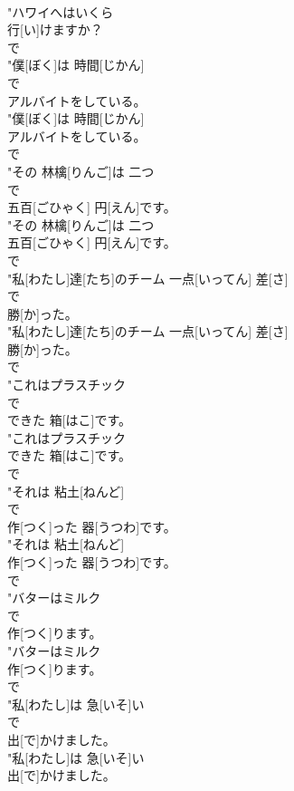 \documentclass[8pt]{extreport}
\begin{document}
\begin{CJK}{UTF8}{min}
\\	"ハワイへはいくら
\\	行[い]けますか？
\\	で
\\	"僕[ぼく]は 時間[じかん]
\\	で
\\	アルバイトをしている。
\\	"僕[ぼく]は 時間[じかん]
\\	アルバイトをしている。
\\	で
\\	"その 林檎[りんご]は 二つ
\\	で
\\	五百[ごひゃく] 円[えん]です。
\\	"その 林檎[りんご]は 二つ
\\	五百[ごひゃく] 円[えん]です。
\\	で
\\	"私[わたし]達[たち]のチーム 一点[いってん] 差[さ]
\\	で
\\	勝[か]った。
\\	"私[わたし]達[たち]のチーム 一点[いってん] 差[さ]
\\	勝[か]った。
\\	で
\\	"これはプラスチック
\\	で
\\	できた 箱[はこ]です。
\\	"これはプラスチック
\\	できた 箱[はこ]です。
\\	で
\\	"それは 粘土[ねんど]
\\	で
\\	作[つく]った 器[うつわ]です。
\\	"それは 粘土[ねんど]
\\	作[つく]った 器[うつわ]です。
\\	で
\\	"バターはミルク
\\	で
\\	作[つく]ります。
\\	"バターはミルク
\\	作[つく]ります。
\\	で
\\	"私[わたし]は 急[いそ]い
\\	で
\\	出[で]かけました。
\\	"私[わたし]は 急[いそ]い
\\	出[で]かけました。

\end{CJK}
\end{document}
